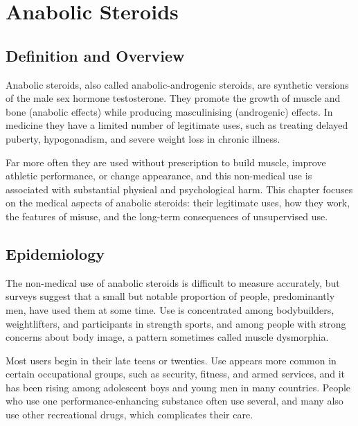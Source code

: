 \chapter{Anabolic Steroids}

\section*{Definition and Overview}
Anabolic steroids, also called anabolic-androgenic steroids, are synthetic versions of the male sex hormone testosterone. They promote the growth of muscle and bone (anabolic effects) while producing masculinising (androgenic) effects. In medicine they have a limited number of legitimate uses, such as treating delayed puberty, hypogonadism, and severe weight loss in chronic illness.

Far more often they are used without prescription to build muscle, improve athletic performance, or change appearance, and this non-medical use is associated with substantial physical and psychological harm. This chapter focuses on the medical aspects of anabolic steroids: their legitimate uses, how they work, the features of misuse, and the long-term consequences of unsupervised use.

\section*{Epidemiology}
The non-medical use of anabolic steroids is difficult to measure accurately, but surveys suggest that a small but notable proportion of people, predominantly men, have used them at some time. Use is concentrated among bodybuilders, weightlifters, and participants in strength sports, and among people with strong concerns about body image, a pattern sometimes called muscle dysmorphia.

Most users begin in their late teens or twenties. Use appears more common in certain occupational groups, such as security, fitness, and armed services, and it has been rising among adolescent boys and young men in many countries. People who use one performance-enhancing substance often use several, and many also use other recreational drugs, which complicates their care.

